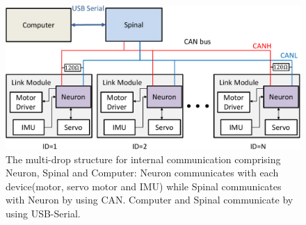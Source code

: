 \begin{figure}[t]
  \begin{center}
    \includegraphics[width=1.0\columnwidth]{figs/internal_communication.pdf}
  \end{center}
  \caption{The multi-drop structure for internal communication comprising Neuron, Spinal and Computer: Neuron communicates with each device(motor, servo motor and IMU) while Spinal communicates with Neuron by using CAN. Computer and Spinal communicate by using USB-Serial.\label{figure:internal_communication}}
\end{figure}
